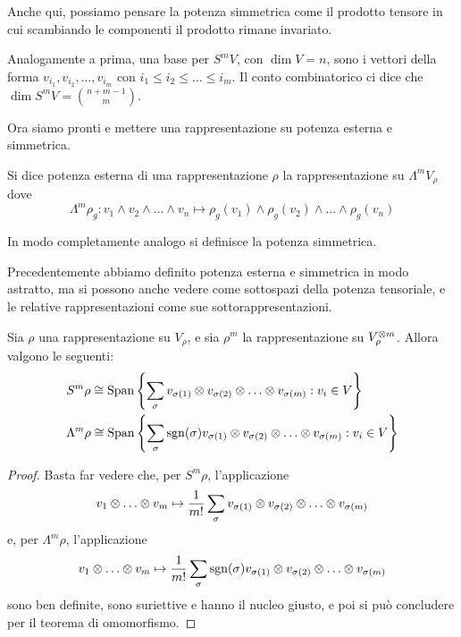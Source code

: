 Anche qui, possiamo pensare la potenza simmetrica come il prodotto tensore in cui scambiando le componenti il prodotto rimane invariato.

Analogamente a prima, una base per $S^mV$, con $\dim V=n$, sono i vettori della forma  $v_{i_1},v_{i_2},\dots,v_{i_m}$ con $i_1\le i_2\le \dots \le i_m$. Il conto combinatorico ci dice che $\dim S^mV = \binom{n+m-1}m$.


Ora siamo pronti e mettere una rappresentazione su potenza esterna e simmetrica.



\begin{mydef}
  Si dice potenza esterna di una rappresentazione $\rho$ la rappresentazione su $\Lambda^m V_\rho$ dove
  \[
  \Lambda^m\rho_g: v_1 \wedge v_2 \wedge \dots \wedge v_n \mapsto \rho_g(v_1) \wedge \rho_g(v_2) \wedge \dots \wedge \rho_g(v_n)
  \]
  
  In modo completamente analogo si definisce la potenza simmetrica.

\end{mydef}

Precedentemente abbiamo definito potenza esterna e simmetrica in modo astratto, ma si possono anche vedere come sottospazi della potenza tensoriale, e le relative rappresentazioni come sue sottorappresentazioni.

\begin{myprop}
  Sia $\rho$ una rappresentazione su $V_\rho$, e sia $\rho^m$ la rappresentazione su $V_\rho^{\otimes m}$. Allora valgono le seguenti: 
  \begin{eqnarray*}
  &S^m\rho \isom \Span{\left\{\sum_\sigma v_{\sigma(1)}\tensor v_{\sigma(2)} \tensor \dots \tensor v_{\sigma(m)}:v_i \in V\right\}}\\
  &\Lambda^m\rho \isom \Span{\left\{\sum_\sigma \sgn(\sigma) v_{\sigma(1)}\tensor v_{\sigma(2)} \tensor \dots \tensor v_{\sigma(m)}:v_i \in V\right\}} 
  \end{eqnarray*}

\end{myprop}

\begin{proof}
  Basta far vedere che, per $S^m\rho$, l'applicazione
  \[
  v_1 \tensor \dots \tensor v_m \mapsto \frac1{m!} \sum_\sigma v_{\sigma(1)}\tensor v_{\sigma(2)} \tensor \dots \tensor v_{\sigma(m)}
  \]
  e, per $\Lambda^m\rho$, l'applicazione
  \[
  v_1 \tensor \dots \tensor v_m \mapsto \frac1{m!} \sum_\sigma \sgn(\sigma) v_{\sigma(1)}\tensor v_{\sigma(2)} \tensor \dots \tensor v_{\sigma(m)}
  \] sono ben definite, sono suriettive e hanno il nucleo giusto, e poi si può concludere per il teorema di omomorfismo. 
\end{proof}